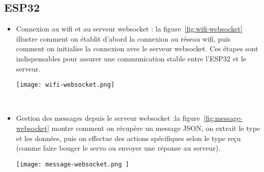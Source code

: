 \subsection{ESP32}
\begin{itemize}
	\item Connexion au wifi et au serveur websocket : la figure~\ref{fig:wifi-websocket} illustre comment on établit d’abord la connexion au réseau wifi, puis comment on initialise la connexion avec le serveur websocket. Ces étapes sont indispensables pour assurer une communication stable entre l’ESP32 et le serveur.
	
	\begin{minipage}{\linewidth}
  		\centering
  		\texttt{[image: wifi-websocket.png]}
  		\label{fig:wifi-websocket}
	\end{minipage}
	\\
	
	\item Gestion des messages depuis le serveur websocket :la figure~\ref{fig:message-websocket} montre comment on récupère un message JSON, on extrait le type et les données, puis on effectue des actions spécifiques selon le type reçu (comme faire bouger le servo ou envoyer une réponse au serveur).\\
	\begin{minipage}{\linewidth}
  		\centering
  		\texttt{[image: message-websocket.png	]}
  		\label{fig:message-websocket}
	\end{minipage}
\end{itemize}


